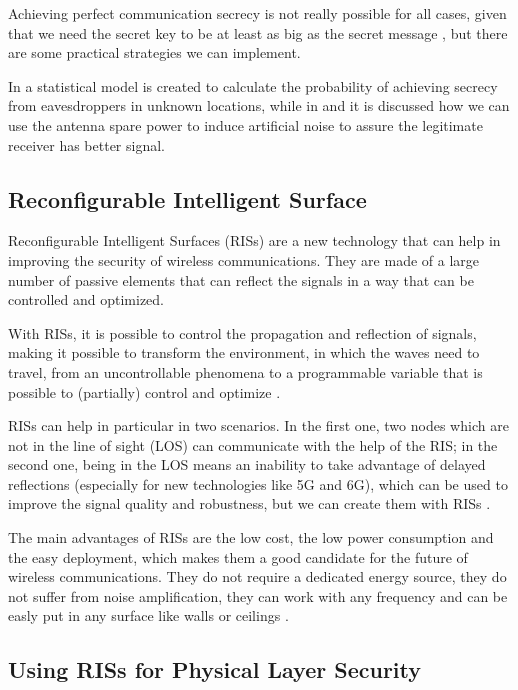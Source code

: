 \documentclass[conference]{IEEEtran}
\begin{document}
Achieving perfect communication secrecy is not really possible for all cases, given that we need the secret key to be at least as big as the secret message \cite{6769090}, but there are some practical strategies we can implement.

In \cite{7543509} a statistical model is created to calculate the probability of achieving secrecy from eavesdroppers in unknown locations, while in \cite{4543070} and \cite{1605889} it is discussed how we can use the antenna spare power to induce artificial noise to assure the legitimate receiver has better signal.

\newpage
\subsection{Reconfigurable Intelligent Surface}

Reconfigurable Intelligent Surfaces (RISs) are a new technology that can help in improving the security of wireless communications. They are made of a large number of passive elements that can reflect the signals in a way that can be controlled and optimized.

With RISs, it is possible to control the propagation and reflection of signals, making it possible to transform the environment, in which the waves need to travel, from an uncontrollable phenomena to a programmable variable that is possible to (partially) control and optimize \cite{9086766}.

RISs can help in particular in two scenarios. In the first one, two nodes which are not in the line of sight (LOS) can communicate with the help of the RIS; in the second one, being in the LOS means an inability to take advantage of delayed reflections (especially for new technologies like 5G and 6G), which can be used to improve the signal quality and robustness, but we can create them with RISs \cite{9086766}.

The main advantages of RISs are the low cost, the low power consumption and the easy deployment, which makes them a good candidate for the future of wireless communications. They do not require a dedicated energy source, they do not suffer from noise amplification, they can work with any frequency and can be easly put in any surface like walls or ceilings \cite{8796365}.

\subsection{Using RISs for Physical Layer Security}
\end{document}
